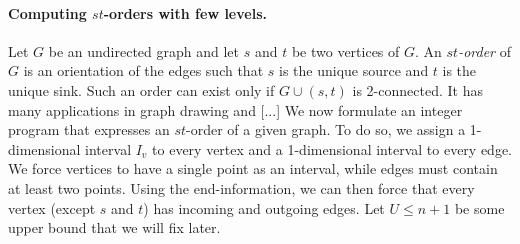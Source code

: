 \documentclass[runningheads]{llncs}
\begin{document}
\paragraph{Computing $st$-orders with few levels.}
Let $G$ be an undirected graph and let $s$ and $t$ be two vertices of
$G$.  An {\em $st$-order} of $G$ is an orientation of the edges such
that $s$ is the unique source and $t$ is the unique sink.  Such an
order can exist only if $G\cup (s,t)$ is 2-connected.  It has many
applications in graph drawing and [...] 
We now formulate an integer program that expresses an $st$-order
of a given graph.  To do so, we assign a 1-dimensional interval $I_v$ to 
every vertex and a 1-dimensional interval to every edge.  We force
vertices to have a single point as an interval, while edges must
contain at least two points.  Using the end-information, we can then
force that every vertex (except $s$ and $t$) has incoming and outgoing
edges.  Let $U\leq n+1$ be some upper bound that we will fix later.
\end{document}
